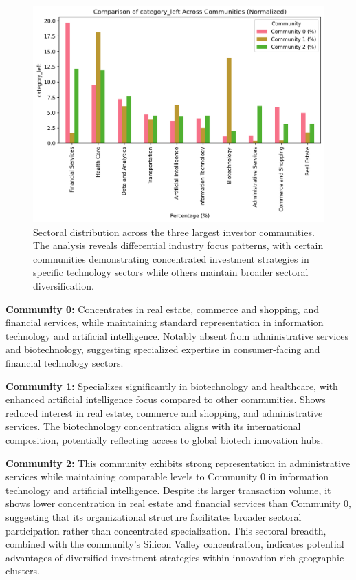 \begin{figure}[htbp]
\centering
\includegraphics[width=1\textwidth]{../figures/us/categorical_comparison_category_left.png}
\caption{Sectoral distribution across the three largest investor communities. The analysis reveals differential industry focus patterns, with certain communities demonstrating concentrated investment strategies in specific technology sectors while others maintain broader sectoral diversification.}
\label{fig:sectoral_distribution}
\end{figure}


\textbf{Community 0:} Concentrates in real estate, commerce and shopping, and financial services, while maintaining standard representation in information technology and artificial intelligence. Notably absent from administrative services and biotechnology, suggesting specialized expertise in consumer-facing and financial technology sectors.

\textbf{Community 1:} Specializes significantly in biotechnology and healthcare, with enhanced artificial intelligence focus compared to other communities. Shows reduced interest in real estate, commerce and shopping, and administrative services. The biotechnology concentration aligns with its international composition, potentially reflecting access to global biotech innovation hubs.

\textbf{Community 2:} This community exhibits strong representation in administrative services while maintaining comparable levels to Community 0 in information technology and artificial intelligence. Despite its larger transaction volume, it shows lower concentration in real estate and financial services than Community 0, suggesting that its organizational structure facilitates broader sectoral participation rather than concentrated specialization. This sectoral breadth, combined with the community's Silicon Valley concentration, indicates potential advantages of diversified investment strategies within innovation-rich geographic clusters.

